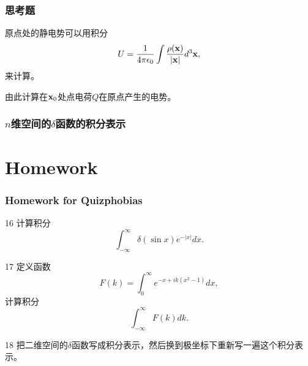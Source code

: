 \documentclass[CJK]{beamer}
\begin{document}
\begin{frame}
  \frametitle{思考题}
  原点处的静电势可以用积分
  $$U = \frac{1}{4\pi\epsilon_0} \int \frac{\rho({\mathbf{x}})}{|{\mathbf{x}}|} d^3{\mathbf{x}}, $$
  来计算。

  \skipline
  
  由此计算在${\mathbf{x}}_0$处点电荷$Q$在原点产生的电势。
\end{frame}


\begin{frame}
  \frametitle{$n$维空间的$\delta$函数的积分表示}
  

\end{frame}



\section{Homework}

\begin{frame}
  \frametitle{Homework for Quizphobias}
  
  \bitem
\item[16]{计算积分$$\int_{-\infty}^\infty \delta\left(\sin x\right) e^{-|x|} dx.$$ }
\item[17]{定义函数
  $$ F(k) = \int_0^\infty e^{-x+ik(x^2-1)} dx, $$
  计算积分
  $$ \int_{-\infty}^\infty F(k) dk. $$}
\item[18]{把二维空间的$\delta$函数写成积分表示，然后换到极坐标下重新写一遍这个积分表示。}  
  \eitem
  
\end{frame}



\ech
\end{document}
